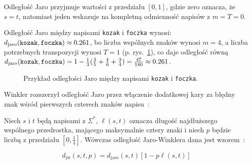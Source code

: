 \documentclass{praca1}
\begin{document}
Odległość Jaro przyjmuje wartości z przedziału $[0,1]$, gdzie zero oznacza, że $s = t$, natomiast jeden wskazuje na kompletną odmienność napisów z $m = T = 0$.

\begin{example}
Odległość Jaro między napisami \verb|kozak| i \verb|foczka| wynosi: $d_{\mathrm{jaro}}(\verb|kozak|, \verb|foczka|)  \approx 0.261$, bo liczba wspólnych znaków wynosi $m = 4$, a liczba potrzebnych transpozycji wynosi $T = 1$ (p. rys.~\ref{rys:005}), co daje odległość równą $d_{\mathrm{jaro}}(\verb|kozak|, \verb|foczka|) = 1 - \frac{1}{3}(\frac{3}{5} + \frac{4}{6} + \frac{3}{4}) = \frac{47}{180} \approx 0.261$.
\end{example}

\begin{figure}[width=80pt]
\centering
{}
\cprotect\caption{Przykład odległości Jaro między napisami \verb|kozak| i \verb|foczka|.}\label{rys:005}
\end{figure}


Winkler rozszerzył odległość Jaro przez włączenie dodatkowej kary za błędny znak wśród pierwszych czterech znaków napisu~\cite{Loo2014:stringdist}:

\begin{definition}
Niech $s$ i $t$ będą napisami z $\Sigma^*$, $\ell(s,t)$ oznacza długość najdłuższego wspólnego przedrostka, mającego maksymalnie cztery znaki i niech $p$ będzie liczbą z przedziału $[0, \frac{1}{4}]$. Wówczas odległość Jaro-Winklera dana jest wzorem~\cite{Winkler1990:stringcomparator}:

\begin{equation}
\label{eq:012}
d_{\mathrm{jw}}(s,t, p) = d_{\mathrm{jaro}}(s,t)[1 - p\ell(s,t)]
\end{equation}
\end{definition}
\end{document}
